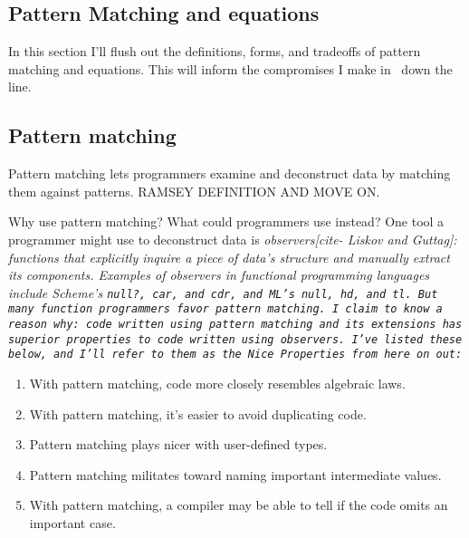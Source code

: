 \documentclass[manuscript,screen,review, 12pt, nonacm]{acmart}
\begin{document}
\begin{outline}[enumerate]


\section{Pattern Matching and equations}
\label{pmandequations}

In this section I'll flush out the definitions, forms, and tradeoffs of pattern
matching and equations. This will inform the compromises I make in \VMinus\ down
the line. 

\subsection{Pattern matching}
\label{pmoverobservers}


Pattern matching lets programmers examine and deconstruct data by matching them
against patterns. RAMSEY DEFINITION AND MOVE ON. 

Why use pattern matching? What could programmers use instead? One tool a
programmer might use to deconstruct data is \it{observers}[cite- Liskov and
Guttag]: functions that explicitly inquire a piece of data's structure and
manually extract its components. Examples of observers in functional programming
languages include Scheme's \tt{null?}, \tt{car}, and \tt{cdr}, and ML's
\tt{null}, \tt{hd}, and \tt{tl}. But many function programmers favor pattern
matching. I claim to know a reason why: \it{code written using pattern matching
and its extensions has superior properties to code written using observers}.
I've listed these below, and I'll refer to them as the Nice Properties from here
on out: 

\begin{enumerate}
    \item With pattern matching, code more closely resembles algebraic laws. 
    \item With pattern matching, it's easier to avoid duplicating code.
    \item Pattern matching plays nicer with user-defined types. 
    \item Pattern matching militates toward naming important intermediate
    values. 
    \item With pattern matching, a compiler may be able to tell if the code
    omits an important case. 
\end{enumerate}


\end{outline}
\end{document}
